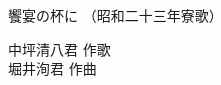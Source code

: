 \documentclass[10pt,b5j]{tarticle} %
\begin{document}
\begin{minipage}[c]{0.7\hsize} %
    \begin{center}
        {\LARGE
            饗宴の杯に %
        }
        {\small 
            （昭和二十三年寮歌） %
        }
    \end{center}
\end{minipage}
\begin{minipage}[c]{0.3\hsize} %
    \begin{flushright} %
        中坪清八君 作歌\\堀井洵君 作曲 %
    \end{flushright}
\end{minipage}
\end{document}

